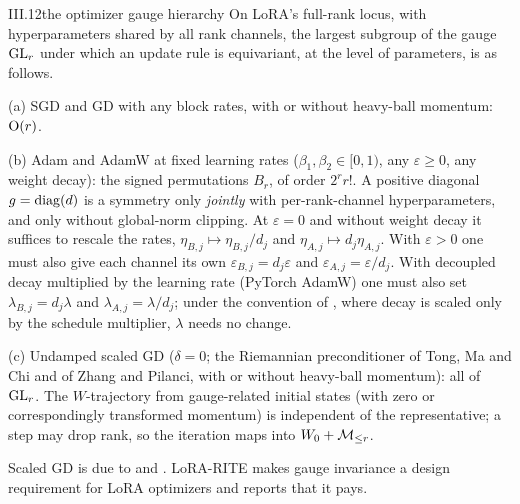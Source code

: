 \begin{theorem}{III.12}{the optimizer gauge hierarchy}
On LoRA's full-rank locus, with hyperparameters shared by all rank channels, the largest subgroup of the gauge $\mathrm{GL}_r$
under which an update rule is equivariant, at the level of parameters, is as follows.

(a) SGD and GD with any block rates, with or without heavy-ball momentum: $\mathrm{O}(r)$.

(b) Adam and AdamW at fixed learning rates ($\beta_1,\beta_2\in[0,1)$, any $\varepsilon\ge0$, any weight decay): the
signed permutations $B_r$, of order $2^rr!$. A positive diagonal $g=\operatorname{diag}(d)$ is a symmetry only \emph{jointly} with
per-rank-channel hyperparameters, and only without global-norm clipping. At $\varepsilon=0$ and without weight decay it
suffices to rescale the rates, $\eta_{B,j}\mapsto\eta_{B,j}/d_j$ and $\eta_{A,j}\mapsto d_j\eta_{A,j}$. With
$\varepsilon>0$ one must also give each channel its own $\varepsilon_{B,j}=d_j\varepsilon$ and
$\varepsilon_{A,j}=\varepsilon/d_j$. With decoupled decay multiplied by the learning rate (PyTorch AdamW) one must also
set $\lambda_{B,j}=d_j\lambda$ and $\lambda_{A,j}=\lambda/d_j$; under the convention of \citet{xloshchilov2019decoupled},
where decay is scaled only by the schedule multiplier, $\lambda$ needs no change.

(c) Undamped scaled GD ($\delta=0$; the Riemannian preconditioner of Tong, Ma and Chi and of Zhang and Pilanci, with or
without heavy-ball momentum): all of $\mathrm{GL}_r$. The $W$-trajectory from gauge-related initial states (with zero or
correspondingly transformed momentum) is independent of the representative; a step may drop rank, so the iteration maps
into $W_0+\mathcal{M}_{\le r}$.
\end{theorem}

Scaled GD is due to \citet{xtong2021accelerating} and \citet{zhang2024riemannian}. LoRA-RITE \citep{yen2024lora} makes
gauge invariance a design requirement for LoRA optimizers and reports that it pays.

